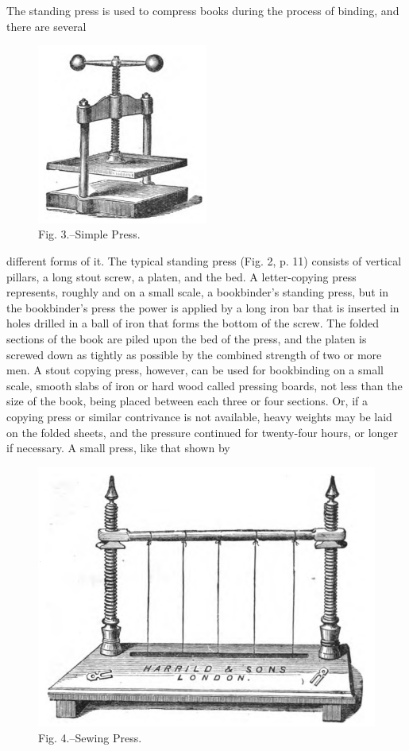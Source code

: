 \documentclass[twoside]{book}
\begin{document}
The standing press is used to compress books
during the process of binding, and there are several
	\begin{figure}[h]
		\centering
		\includegraphics[width=0.5\textwidth]{Figures/_003.png}
		\caption*{Fig. 3.--Simple Press.}
	\end{figure}
different forms of it. The typical standing press
(Fig. 2, p. 11) consists of vertical pillars, a long stout
screw, a platen, and the bed. A letter-copying
press represents, roughly and on a small scale, a
bookbinder's standing press, but in the bookbinder's
press the power is applied by a long iron bar that
is inserted in holes drilled in a ball of iron that
forms the bottom of the screw. The folded sections
of the book are piled upon the bed of the press,
and the platen is screwed down as tightly as
possible by the combined strength of two or more men.
A stout copying press, however, can be used \pagebreak
for bookbinding on a small scale, smooth slabs of
iron or hard wood called pressing boards, not less
than the size of the book, being placed between
each three or four sections. Or, if a copying press
or similar contrivance is not available, heavy
weights may be laid on the folded sheets, and the
pressure continued for twenty-four hours, or longer
if necessary. A small press, like that shown by
	\begin{figure}[h]
		\centering
		\includegraphics[width=\textwidth]{Figures/_004.png}
		\caption*{Fig. 4.--Sewing Press.}
	\end{figure}
\end{document}

